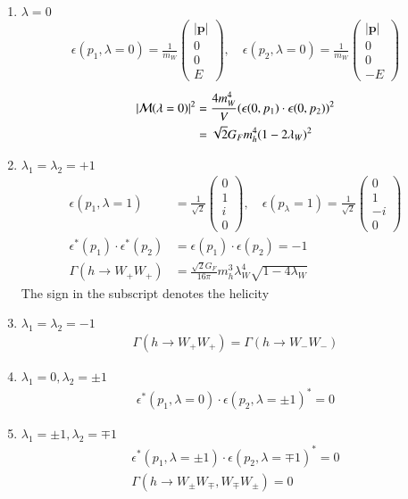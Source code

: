 \begin{enumerate}
   \item $\lambda = 0$ 
      \begin{align*}
         \epsilon(p_1, \lambda=0) = \frac{1}{m_W} \begin{pmatrix} |\pmb{p}| \\ 0 \\ 0 \\ E\end{pmatrix}, \quad
         \epsilon(p_2, \lambda=0) = \frac{1}{m_W} \begin{pmatrix} |\pmb p| \\ 0 \\ 0 \\ - E \end{pmatrix}
      \end{align*}
      \begin{align*}
         |\mathcal{M} (\lambda=0)|^2 &= \frac{4 m_W^4}{V} ( \epsilon(0, p_1) \cdot \epsilon(0, p_2))^2 \\
                            &= \sqrt{2} G_F m_h^4 (1-2 \lambda_W)^2
      \end{align*}
   \item $\lambda_1 = \lambda_2 = +1$
      \begin{align*}
         \epsilon(p_1, \lambda=1) &= \frac{1}{\sqrt{2}} \begin{pmatrix} 0 \\ 1 \\ i \\ 0\end{pmatrix}, \quad
         \epsilon(p_ \lambda=1) = \frac{1}{\sqrt{2}} \begin{pmatrix} 0 \\ 1 \\ -i \\ 0\end{pmatrix} \\
         \epsilon^*(p_1) \cdot \epsilon^*(p_2) &= \epsilon(p_1) \cdot \epsilon(p_2) = - 1 \\
         \Gamma(h \rightarrow W_+ W_+) &= \frac{\sqrt{2}G_F}{16\pi} m_h^3 \lambda_W^4 \sqrt{1- 4 \lambda_W}
      \end{align*}
      The sign in the subscript denotes the helicity
   \item $\lambda_1 = \lambda_2 = -1$ 
      \begin{align*}
        \Gamma(h \rightarrow W_+ W_+) = \Gamma( h \rightarrow W_- W_-) 
      \end{align*}
   \item $\lambda_1 = 0, \lambda_2 = \pm 1$
      \begin{align*}
         \epsilon^*(p_1, \lambda=0) \cdot \epsilon(p_2, \lambda=\pm1)^* = 0
      \end{align*}
   \item $\lambda_1 = \pm 1, \lambda_2 = \mp 1$
      \begin{align*}
         \epsilon^*(p_1, \lambda=\pm 1 ) \cdot \epsilon(p_2, \lambda=\mp 1)^* = 0 \\
         \Gamma(h \rightarrow W_\pm W_\mp, W_\mp W_\pm) = 0
      \end{align*}
\end{enumerate}

